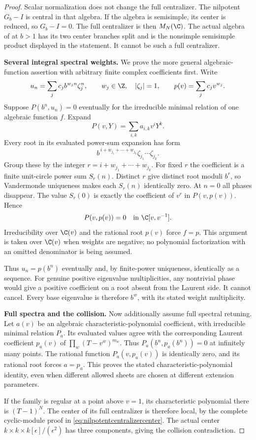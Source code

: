 \begin{proof}
Scalar normalization does not change the full centralizer.
The nilpotent $G_b-I$ is central in that algebra.
If the algebra is semisimple, its center is reduced,
so $G_b-I=0$.
The full centralizer is then $M_N(\C)$.
The actual algebra of  at $b>1$ has its two
center branches split and is the nonsimple semisimple
product displayed in the statement. It cannot be
such a full centralizer.

\par\smallskip\noindent\textbf{Several integral spectral weights.}\quad
We prove the more general algebraic-function assertion
with arbitrary finite complex coefficients first.
Write
\[
 u_n=\sum_j c_j b^{w_jn}\zeta_j^n,\qquad
 w_j\in\Z,\quad |\zeta_j|=1,
 \qquad p(v)=\sum_j c_jv^{w_j}.
\]
Suppose $P(b^n,u_n)=0$ eventually for the irreducible
minimal relation of one algebraic function $f$.
Expand
\[
 P(v,Y)=\sum_{i,k}a_{i,k}v^iY^k.
\]
Every root in its evaluated power-sum expansion has form
\[
 b^{\,i+w_{j_1}+\cdots+w_{j_k}}
       \zeta_{j_1}\cdots\zeta_{j_k}.
\]
Group these by the integer
$r=i+w_{j_1}+\cdots+w_{j_k}$.
For fixed $r$ the coefficient is a finite unit-circle
power sum $S_r(n)$.
Distinct $r$ give distinct root moduli $b^r$, so
Vandermonde uniqueness makes each $S_r(n)$ identically
zero. At $n=0$ all phases disappear.
The value $S_r(0)$ is exactly the coefficient of $v^r$
in $P(v,p(v))$. Hence
\[
 P(v,p(v))=0\quad\hbox{in }\C[v,v^{-1}].
\]
Irreducibility over $\C(v)$ and the rational root $p(v)$
force $f=p$.
This argument is taken over $\C(v)$ when weights are
negative; no polynomial factorization with an omitted
denominator is being assumed.

Thus $u_n=p(b^n)$ eventually and, by finite-power
uniqueness, identically as a sequence.
For genuine positive eigenvalue multiplicities, any
nontrivial phase would give a positive coefficient on
a root absent from the Laurent side. It cannot cancel.
Every base eigenvalue is therefore $b^w$, with its
stated weight multiplicity.

\par\smallskip\noindent\textbf{Full spectra and the collision.}\quad
Now additionally assume full spectral retuning.
Let $a(v)$ be an algebraic characteristic-polynomial
coefficient, with irreducible minimal relation $P_a$.
Its evaluated values agree with the corresponding
Laurent coefficient $p_a(v)$ of
$\prod_w(T-v^w)^{m_w}$.
Thus $P_a(b^n,p_a(b^n))=0$ at infinitely many points.
The rational function $P_a(v,p_a(v))$ is identically
zero, and its rational root forces $a=p_a$.
This proves the stated characteristic-polynomial identity,
even when different allowed sheets are chosen at
different extension parameters.

If the family is regular at a point above $v=1$,
its characteristic polynomial there is $(T-1)^N$.
The center of its full centralizer is therefore local,
by the complete cyclic-module proof in
\eqref{eq:nilpotentcentralizercenter}.
The actual center
$k\times k\times k[\epsilon]/(\epsilon^2)$
has three components, giving the collision contradiction.
\end{proof}

